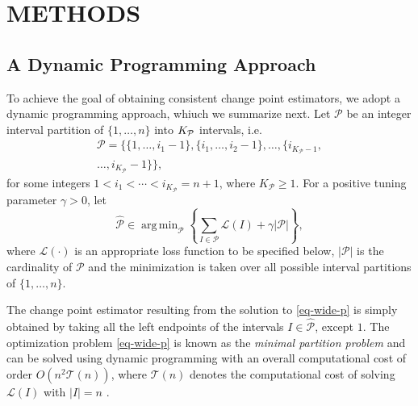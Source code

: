 \documentclass[twoside]{article}
\DeclareMathOperator*{\argmin}{arg\,min}
\begin{document}
\section{METHODS}

\subsection{A Dynamic Programming Approach}

To achieve the goal of obtaining consistent change point estimators, we adopt a dynamic programming approach, whiuch we summarize next.  Let $\mathcal{P}$ be an integer interval partition of $\{1, \ldots, n\}$ into $K_{\cal P}$ intervals, i.e.
	\begin{align*}
		\mathcal{P} = \big\{\{1, \ldots, i_1-1\}, \{i_1, \ldots, i_2-1\}, \ldots, \{i_{K_{\mathcal{P}}-1}, \\
		\ldots, i_{K_{\mathcal{P}}} - 1\}\big\},
	\end{align*}
	for some integers $1 < i_1 < \cdots < i_{K_{\mathcal{P}}} = n + 1$, where $K_{\mathcal{P}} \geq 1$.  For a positive tuning parameter $\gamma > 0$, let 
	\begin{equation}\label{eq-wide-p}
		\widehat{\mathcal{P}} \in \argmin_{\mathcal{P}} \left\{\sum_{I \in \mathcal{P}} \mathcal{L}(I) + \gamma |\mathcal{P}|\right\}, 
	\end{equation}
	where $\mathcal{L}(\cdot)$ is an appropriate loss function to be specified below, $|\mathcal{P}|$ is the cardinality of $\mathcal{P}$ and the minimization is taken over all possible interval partitions of $\{1, \ldots, n\}$.
	
The change point estimator resulting from the solution to \eqref{eq-wide-p} is simply obtained by taking all the left endpoints of the intervals $I \in \widehat{\mathcal{P}}$, except $1$.  The optimization problem \eqref{eq-wide-p} is known as the \emph{minimal partition problem} and can be solved using dynamic programming with an overall computational cost of order $O(n^2 \mathcal T(n))$, where $\mathcal T(n)$ denotes the computational cost of solving $\mathcal{L}(I)$ with $|I| = n$ \citep[see e.g.~Algorithm 1 in][]{FriedrichEtal2008}.
\end{document}
